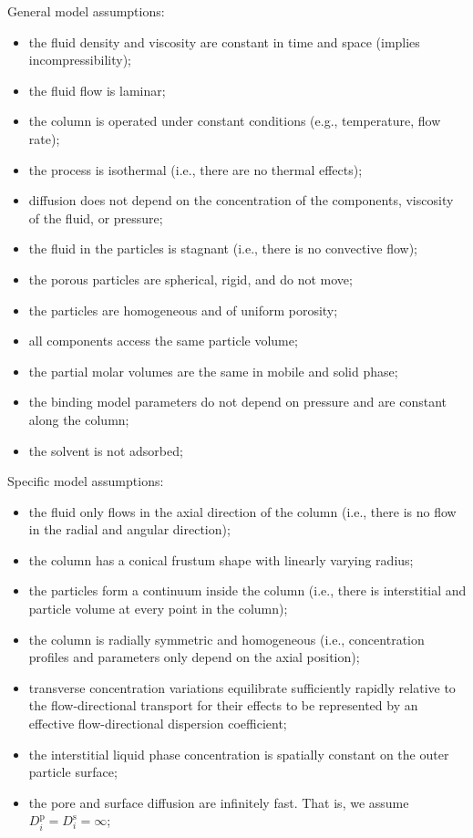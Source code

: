 \documentclass{article}
\begin{document}
General model assumptions:
\begin{itemize}
    \item the fluid density and viscosity are constant in time and space (implies incompressibility);
    \item the fluid flow is laminar;
    \item the column is operated under constant conditions (e.g., temperature, flow rate);
    \item the process is isothermal (i.e., there are no thermal effects);
    \item diffusion does not depend on the concentration of the components, viscosity of the fluid, or pressure;
    \item the fluid in the particles is stagnant (i.e., there is no convective flow);
    \item the porous particles are spherical, rigid, and do not move;
    \item the particles are homogeneous and of uniform porosity;
    \item all components access the same particle volume;
    \item the partial molar volumes are the same in mobile and solid phase;
    \item the binding model parameters do not depend on pressure and are constant along the column;
    \item the solvent is not adsorbed;
\end{itemize}

Specific model assumptions:
\begin{itemize}
    \item the fluid only flows in the axial direction of the column (i.e., there is no flow in the radial and angular direction);
    \item the column has a conical frustum shape with linearly varying radius;
    \item the particles form a continuum inside the column (i.e., there is interstitial and particle volume at every point in the column);
    \item the column is radially symmetric and homogeneous (i.e., concentration profiles and parameters only depend on the axial position);
    \item transverse concentration variations equilibrate sufficiently rapidly relative to the flow-directional transport for their effects to be represented by an effective flow-directional dispersion coefficient;
    \item the interstitial liquid phase concentration is spatially constant on the outer particle surface;
    \item the pore and surface diffusion are infinitely fast. That is, we assume $D^{\mathrm{p}}_{i} = D^{\mathrm{s}}_{i} = \infty$;
\end{itemize}
\end{document}
